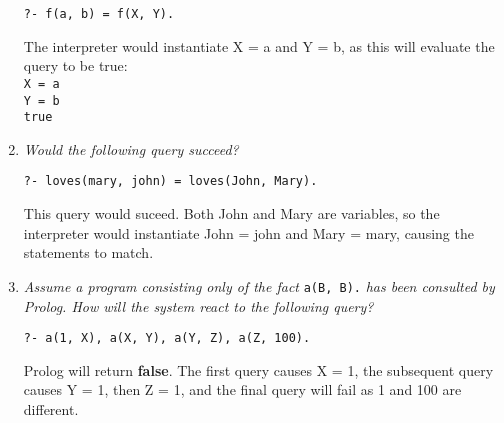 \documentclass{report}
\newcommand{\code}[1]{\texttt{#1}}
\begin{document}
\begin{enumerate}[label=(\alph*)]
    \centerline{\code{?- f(a, b) = f(X, Y).}}
    
    The interpreter would instantiate X = a and Y = b, as this will evaluate the query to be true: \\
    \code{X = a} \\
    \code{Y = b} \\
    \code{true} \\

    \item \emph{Would the following query succeed?}
    
    \centerline{\code{?- loves(mary, john) = loves(John, Mary).}}

    This query would suceed. Both John and Mary are variables, so the interpreter would instantiate John = john and Mary = mary, causing the statements to match.

    \item \emph{Assume a program consisting only of the fact }  \code{a(B, B).} \emph{has been consulted by Prolog. How will the system react to the following query?}
    
    \centerline{\code{?- a(1, X), a(X, Y), a(Y, Z), a(Z, 100).}}

    Prolog will return \textbf{false}. The first query causes X = 1, the subsequent query causes Y = 1, then Z = 1, and the final query will fail as 1 and 100 are different.

\end{enumerate}
\end{document}
